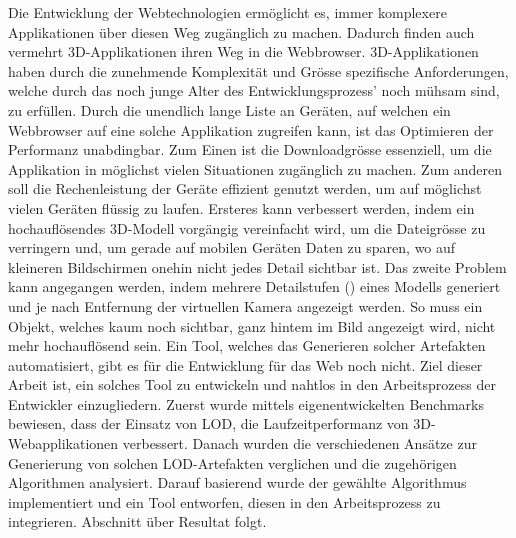 Die Entwicklung der Webtechnologien ermöglicht es, immer komplexere Applikationen über diesen Weg zugänglich zu machen. Dadurch finden auch vermehrt 3D-Applikationen ihren Weg in die Webbrowser.
3D-Applikationen haben durch die zunehmende Komplexität und Grösse spezifische Anforderungen, welche durch das noch junge Alter des Entwicklungsprozess' noch mühsam sind, zu erfüllen.
Durch die unendlich lange Liste an Geräten, auf welchen ein Webbrowser auf eine solche Applikation zugreifen kann, ist das Optimieren der Performanz unabdingbar.
Zum Einen ist die Downloadgrösse essenziell, um die Applikation in möglichst vielen Situationen zugänglich zu machen. Zum anderen soll die Rechenleistung der Geräte effizient genutzt werden, um auf möglichst vielen Geräten flüssig zu laufen.
Ersteres kann verbessert werden, indem ein hochauflösendes 3D-Modell vorgängig vereinfacht wird, um die Dateigrösse zu verringern und, um gerade auf mobilen Geräten Daten zu sparen, wo auf kleineren Bildschirmen onehin nicht jedes Detail sichtbar ist.
Das zweite Problem kann angegangen werden, indem mehrere Detailstufen () eines Modells generiert und je nach Entfernung der virtuellen Kamera angezeigt werden. So muss ein Objekt, welches kaum noch sichtbar, ganz hintem im Bild angezeigt wird, nicht mehr hochauflösend sein.
Ein Tool, welches das Generieren solcher Artefakten automatisiert, gibt es für die Entwicklung für das Web noch nicht.
Ziel dieser Arbeit ist, ein solches Tool zu entwickeln und nahtlos in den Arbeitsprozess der Entwickler einzugliedern.
\bigbreak
Zuerst wurde mittels eigenentwickelten Benchmarks bewiesen, dass der Einsatz von LOD, die Laufzeitperformanz von 3D-Webapplikationen verbessert.
Danach wurden die verschiedenen Ansätze zur Generierung von solchen LOD-Artefakten verglichen und die zugehörigen Algorithmen analysiert.
Darauf basierend wurde der gewählte Algorithmus implementiert und ein Tool entworfen, diesen in den Arbeitsprozess zu integrieren.
\bigbreak
Abschnitt über Resultat folgt.
